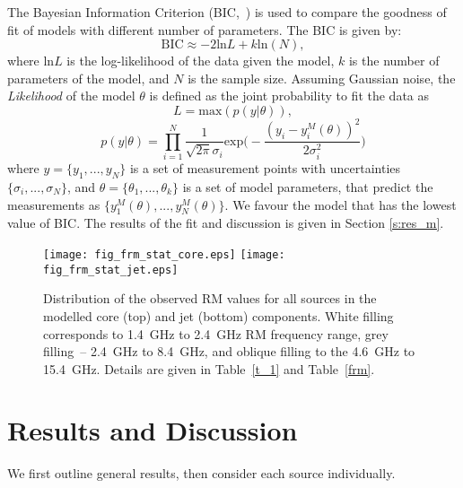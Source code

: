 \documentclass[a4paper,fleqn,usenatbib,useAMS]{mnras}
\begin{document}
The Bayesian Information Criterion (BIC,~\citealt{schwarz_78}) is used to compare the goodness of fit of models with different number of parameters. 
The BIC is given by:
\begin{equation}
\mathrm{BIC} \approx -2\mathrm{ln}L+k\mathrm{ln}(N),
\end{equation}
where ln$L$ is the log-likelihood of the data given the model, $k$ is the number of parameters of the model, and $N$ is the sample size.
Assuming Gaussian noise, the \textit{Likelihood} of the model $\theta$ is defined as the joint probability to fit the data as
\[L = \mathrm{max}(p(y|\theta)),\]
\begin{equation}
p(y|\theta) = \prod_{i=1}^{N} \frac{1}{\sqrt{2\pi}\sigma_i}\mathrm{exp}\Big(-\frac{(y_i-y_i^M(\theta))^2}{2\sigma_i^2}\Big) %
\end{equation}
where $y=\{y_1,...,y_N\}$ is a set of measurement points with uncertainties $\{\sigma_i,...,\sigma_N\}$, and $\theta=\{\theta_1,...,\theta_k\}$ is a set of model parameters, that predict the measurements as $\{y_1^M(\theta),...,y_N^M(\theta)\}$.
We favour the model that has the lowest value of BIC. 
The results of the fit and discussion is given in Section \ref{s:res_m}.




\begin{figure}
 \centering
 \texttt{[image: fig\_frm\_stat\_core.eps]}
 \texttt{[image: fig\_frm\_stat\_jet.eps]}
 \caption{Distribution of the observed RM values for all sources in the modelled core (top) and jet (bottom) components. White filling corresponds to 1.4~GHz to 2.4~GHz RM frequency range, grey filling~-- 2.4~GHz to 8.4~GHz, and oblique filling to the 4.6~GHz to 15.4~GHz. Details are given in Table~\ref{t_1} and Table~\ref{frm}.
 \label{rmdist}
 }
\end{figure}





\section{Results and Discussion}
\label{s:frm_res}
We first outline general results, then consider each source individually.
\end{document}

